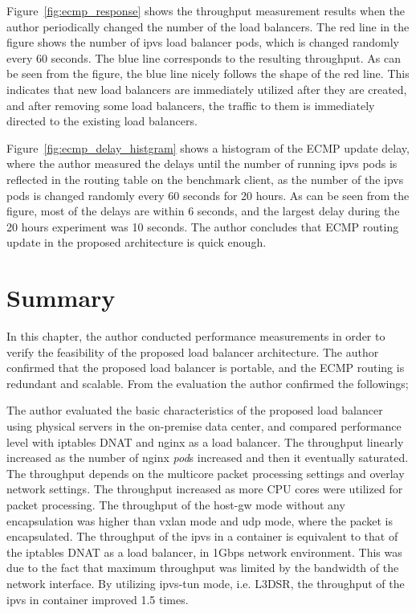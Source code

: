 Figure~\ref{fig:ecmp_response} shows the throughput measurement results when the author periodically changed the number of the load balancers. 
The red line in the figure shows the number of ipvs load balancer pods, which is changed randomly every 60 seconds.
The blue line corresponds to the resulting throughput.
As can be seen from the figure, the blue line nicely follows the shape of the red line.
This indicates that new load balancers are immediately utilized after they are created, and after removing some load balancers, the traffic to them is immediately directed to the existing load balancers.

Figure~\ref{fig:ecmp_delay_histgram} shows a histogram of the ECMP update delay, where the author measured the delays until the number of running ipvs pods is reflected in the routing table on the benchmark client, as the number of the ipvs pods is changed randomly every 60 seconds for 20 hours.
As can be seen from the figure, most of the delays are within 6 seconds, and the largest delay during the 20 hours experiment was 10 seconds.
The author concludes that ECMP routing update in the proposed architecture is quick enough.

\FloatBarrier

\section{Summary}\label{Conclusions}

In this chapter, the author conducted performance measurements in order to verify the feasibility of the proposed load balancer architecture.
The author confirmed that the proposed load balancer is portable, and the ECMP routing is redundant and scalable.
From the evaluation the author confirmed the followings;

The author evaluated the basic characteristics of the proposed load balancer  using physical servers in the on-premise data center, and compared performance level with iptables DNAT and nginx as a load balancer.
The throughput linearly increased as the number of nginx {\em pod}s increased and then it eventually saturated.
The throughput depends on the multicore packet processing settings and overlay network settings.
The throughput increased as more CPU cores were utilized for packet processing.
The throughput of the host-gw mode without any encapsulation was higher than vxlan mode and udp mode, where the packet is encapsulated.
The throughput of the ipvs in a container is equivalent to that of the iptables DNAT as a load balancer, in 1Gbps network environment.
This was due to the fact that maximum throughput was limited by the bandwidth of the network interface.
By utilizing ipvs-tun mode, i.e. L3DSR, the throughput of the ipvs in container improved 1.5 times.


